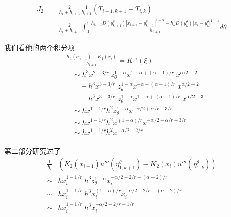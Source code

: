 \documentclass{ctexart}
\theoremstyle{definition}
\theoremstyle{remark}
\numberwithin{equation}{section}
\begin{document}
\begin{equation}
    \begin{aligned}
        J_2 & = \frac{2}{h_i + h_{i+1}}\frac{1}{h_{i+1}} \left(T_{i+1, k+1} -T_{i,k} \right)                                                                                                \\
            & = \frac{2}{h_i + h_{i+1}} \int_{0}^1 \frac{h_{k+1}D(y_{k+1}^\theta)|x_{i+1}-y_{k+1}^\theta|^{1-\alpha} - h_k D(y_{k}^\theta)|x_{i}-y_{k}^\theta|^{1-\alpha}}{h_{i+1}} d\theta
    \end{aligned}
\end{equation}

我们看他的两个积分项
\begin{equation}
    \begin{aligned}
         & \frac{K_1(x_{i+1}) - K_1(x_{i})}{h_{i+1}} = K_1'(\xi)                                       \\
         & \quad \sim h^3 x^{2-3/r} \; z_\theta^{1-\alpha} x^{1-\alpha+(\alpha-1)/r} \; x^{\alpha/2-2} \\
         & \qquad + h^3 x^{3-3/r} \; z_\theta^{1-\alpha} x^{-\alpha+(\alpha-1)/r} \; x^{\alpha/2-2}    \\
         & \qquad + h^3 x^{3-3/r} \; z_\theta^{1-\alpha} x^{1-\alpha+(\alpha-1)/r} \; x^{\alpha/2-3}   \\
         & \quad \sim hx^{1-1/r} h^2 z_\theta^{1-\alpha} x^{-\alpha/2+\alpha/r-3/r}                    \\
         & \quad \sim hx^{1-1/r} h^2 x^{(1-\alpha)/r} x^{-\alpha/2+\alpha/r-3/r}                       \\
         & \quad \sim hx^{1-1/r} h^2 x^{-\alpha/2-2/r}                                                 \\
    \end{aligned}
\end{equation}

第二部分研究过了
\begin{equation}
    \begin{aligned}
        \frac{1}{h_i} & (K_2(x_{i+1}) u'''(\eta_{1,k+1}^\theta) - K_2(x_{i}) u'''(\eta_{1,k}^\theta)) \\
        \sim          & hx_i^{1-1/r} \; h^3 z_\theta^{1-\alpha} x_i^{-\alpha/2-2/r+(\alpha-2)/r}      \\
        \sim          & hx_i^{1-1/r} \; h^3 x_i^{(1-\alpha)/r} x_i^{-\alpha/2-2/r+(\alpha-2)/r}       \\
        \sim          & hx_i^{1-1/r} \; h^3 x_i^{-\alpha/2-2/r-1/r}                                   \\
    \end{aligned}
\end{equation}
\end{document}
